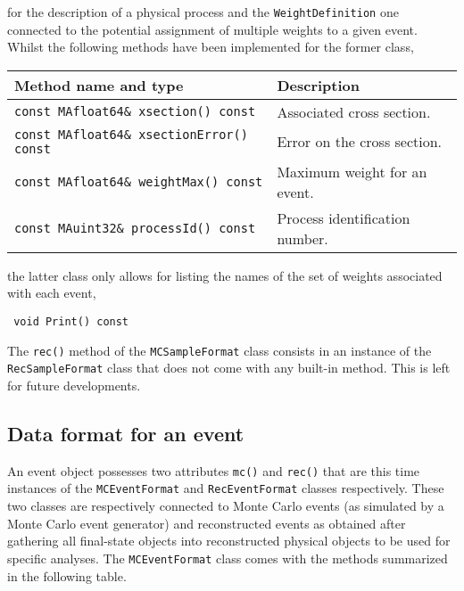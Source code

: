 \documentclass[a4paper]{article}
\begin{document}
for the description of a physical process and the {\color{ao}\verb+WeightDefinition+} one
connected to the potential assignment of multiple weights to a given
event\cite{Andersen:2014efa}. Whilst the
following methods have been implemented for the former class,
\renewcommand{\arraystretch}{1.2}%
\begin{center}\begin{tabular}{l p{4.8cm}}
\hline
Method name and type & Description\\
\hline
\color{ao}\verb+const MAfloat64& xsection() const+ & Associated cross section.\\
\color{ao}\verb+const MAfloat64& xsectionError() const+ & Error on the cross
  section.\\
\color{ao}\verb+const MAfloat64& weightMax() const+ & Maximum weight for an event.\\
\color{ao}\verb+const MAuint32& processId() const+ & Process identification number.\\
\hline
\end{tabular}
\end{center}
the latter class only allows for listing the names of the set of weights
associated with each event,
{\color{ao}\begin{verbatim}
 void Print() const
\end{verbatim}}
\noindent The {\color{ao}\verb+rec()+} method of the {\color{ao}\verb+MCSampleFormat+} class consists in an
instance of the {\color{ao}\verb?RecSampleFormat?} class that does not come with any
built-in method. This is left for future developments.

\newpage
\begin{shaded}
\section{\Large Data format for an event}
\end{shaded}

\noindent An event object possesses two attributes {\color{ao}\verb+mc()+} and {\color{ao}\verb+rec()+} that are
this time instances of the {\color{ao}\verb+MCEventFormat+} and {\color{ao}\verb+RecEventFormat+}
classes respectively. These two classes are respectively connected to Monte
Carlo events (as simulated by a Monte Carlo event generator) and reconstructed
events as obtained after gathering all final-state objects into reconstructed
physical objects to be used for specific analyses. The {\color{ao}\verb+MCEventFormat+}
class comes with the methods summarized in the following table.
\end{document}
